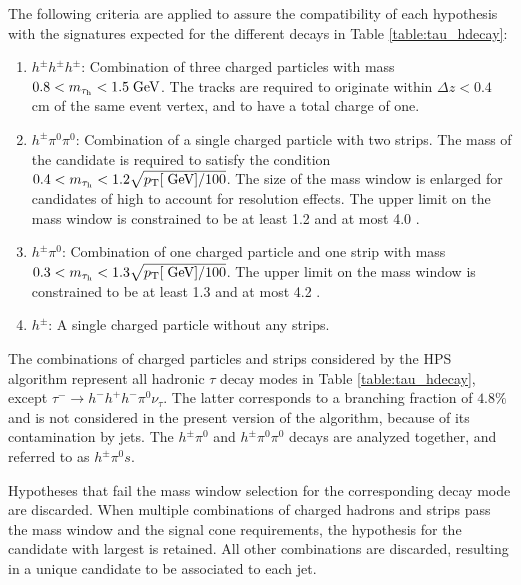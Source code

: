 The following criteria are applied to assure the compatibility of each hypothesis with the signatures expected for the different \hadtau decays in Table \ref{table:tau_hdecay}:

\begin{enumerate}
	\item \ensuremath{h^{\pm}h^{\pm}h^{\pm}}: Combination of three charged particles with mass \ensuremath{0.8 < m_{\hadtau} < 1.5 \gev}. The tracks are required to originate within \ensuremath{\Delta z < 0.4} cm of the same event vertex, and to have a total charge of one.
	\item \ensuremath{h^{\pm}\pi^{0}\pi^{0}}: Combination of a single charged particle with two strips. The mass of the \hadtau candidate is required to satisfy the condition \ensuremath{0.4 < m_{\hadtau} < 1.2 \sqrt{\pt [\gev]/100}}\gev. The size of the mass window is enlarged for \hadtau candidates of high \pt to account for resolution effects. The upper limit on the mass window is constrained to be at least 1.2 and at most 4.0 \gev.
	\item \ensuremath{h^{\pm}\pi^{0}}: Combination of one charged particle and one strip with mass \ensuremath{0.3 < m_{\hadtau} < 1.3 \sqrt{\pt [\gev]/100}}\gev. The upper limit on the mass window is constrained to be at least 1.3 and at most 4.2 \gev.
	\item \ensuremath{h^{\pm}}: A single charged particle without any strips.
\end{enumerate}

The combinations of charged particles and strips considered by the HPS algorithm represent all hadronic \ensuremath{\tau} decay modes in Table \ref{table:tau_hdecay}, except \ensuremath{τ^{-} \longrightarrow h^{-}h^{+}h^{-}\pi^{0}\nu_{\tau}}. The latter corresponds to a branching fraction of \ensuremath{4.8\%} and is not considered in the present version of the algorithm, because of its contamination by jets. The \ensuremath{h^{\pm}\pi^{0}} and \ensuremath{h^{\pm}\pi^{0}\pi^{0}} decays are analyzed together, and referred to as \ensuremath{h^{\pm}\pi^{0}s}.

Hypotheses that fail the mass window selection for the corresponding decay mode are discarded. When multiple combinations of charged hadrons and strips pass the mass window and the signal cone requirements, the hypothesis for the candidate with largest \pt is retained. All other combinations are discarded, resulting in a unique \hadtau candidate to be associated to each jet.

